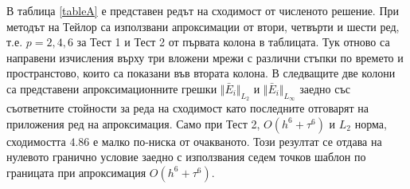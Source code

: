 \documentclass{article}
\begin{document}
В таблица \ref{tableA} е представен редът на сходимост от численото решение. При методът на Тейлор са използвани апроксимации от втори, четвърти и шести ред, т.е. $p=2,4,6$ за Тест 1 и Тест 2 от първата колона в таблицата. Тук отново са направени изчисления върху три вложени мрежи с различни стъпки по времето и пространстово, които са показани във втората колона. В следващите две колони са представени апроксимационните грешки $\Vert \bar E_i \Vert_{L_2} $ и $\Vert \bar E_i \Vert_{L_\infty}$ заедно със съответните стойности за реда на сходимост като последните отговарят на приложения ред на апроксимация. Само при Тест 2, $O(h^6 + \tau^6)$ и $L_2$ норма, сходимостта $4.86$ е малко по-ниска от очакваното. Този резултат се отдава на нулевото гранично условие заедно с използвания седем точков шаблон по границата при апроксимация $O(h^6 + \tau^6)$.
\begin{table}[ht]
\centering
\small
		\begin{tabular}{||c|l|ll|ll||}
			\hline
			\hline



\end{tabular}
\end{table}
\end{document}
